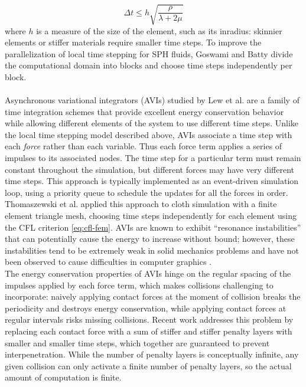 \begin{equation}
  \label{eq:cfl-fem}
  \Delta t \le h\sqrt{\frac\rho{\lambda+2\mu}}
\end{equation}
where $h$ is a measure of the size of the element, such as its inradius: skinnier elements or stiffer materials require smaller time steps.
To improve the parallelization of local time stepping for SPH fluids, Goswami and Batty \cite{Goswami2014} divide the computational domain into blocks and choose time steps independently per block.
\\ \\
Asynchronous variational integrators (AVIs) studied by Lew et al. \cite{Lew2004} are a family of time integration schemes that provide excellent energy conservation behavior while allowing different elements of the system to use different time steps.
Unlike the local time stepping model described above, AVIs associate a time step with each \emph{force} rather than each variable.
Thus each force term applies a series of impulses to its associated nodes.
The time step for a particular term must remain constant throughout the simulation, but different forces may have very different time steps.
This approach is typically implemented as an event-driven simulation loop, using a priority queue to schedule the updates for all the forces in order.
Thomaszewski et al. \cite{Thomaszewski2008} applied this approach to cloth simulation with a finite element triangle mesh, choosing time steps independently for each element using the CFL criterion \eqref{eq:cfl-fem}.
AVIs are known to exhibit ``resonance instabilities'' that can potentially cause the energy to increase without bound; however, these instabilities tend to be extremely weak in solid mechanics problems \cite{Fong2007} and have not been observed to cause difficulties in computer graphics \cite{Harmon2009}.
\\
The energy conservation properties of AVIs hinge on the regular spacing of the impulses applied by each force term, which makes collisions challenging to incorporate: naively applying contact forces at the moment of collision breaks the periodicity and destroys energy conservation, while applying contact forces at regular intervals risks missing collisions.
Recent work \cite{Harmon2009,Ainsley2012} addresses this problem by replacing each contact force with a sum of stiffer and stiffer penalty layers with smaller and smaller time steps, which together are guaranteed to prevent interpenetration.
While the number of penalty layers is conceptually infinite, any given collision can only activate a finite number of penalty layers, so the actual amount of computation is finite.
